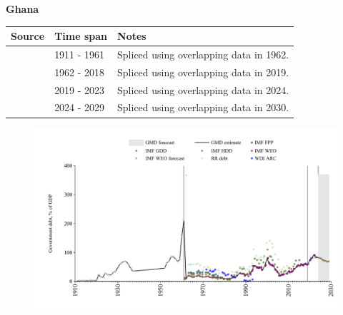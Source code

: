 \documentclass[12pt,a4paper,landscape]{article}
\begin{document}
\begin{adjustbox}{max totalsize={\paperwidth}{\paperheight},center}
\begin{minipage}[t][\textheight][t]{\textwidth}
\vspace*{0.5cm}
{}
\begin{center}
{\Large\bfseries Ghana}
\end{center}
\vspace{0.5cm}
\begin{table}[H]
\centering
\small
\begin{tabular}{|l|l|l|}
\hline
\textbf{Source} & \textbf{Time span} & \textbf{Notes} \\
\hline
\rowcolor{white}\cite{RR_debt}& 1911 - 1961 &Spliced using overlapping data in 1962.\\
\rowcolor{lightgray}\cite{IMF_GDD}& 1962 - 2018 &Spliced using overlapping data in 2019.\\
\rowcolor{white}\cite{IMF_FPP}& 2019 - 2023 &Spliced using overlapping data in 2024.\\
\rowcolor{lightgray}\cite{IMF_WEO_forecast}& 2024 - 2029 &Spliced using overlapping data in 2030.\\
\hline
\end{tabular}
\end{table}
\begin{figure}[H]
\centering
\includegraphics[width=\textwidth,height=0.6\textheight,keepaspectratio]{graphs/GHA_govdebt_GDP.pdf}
\end{figure}
\end{minipage}
\end{adjustbox}
\end{document}
